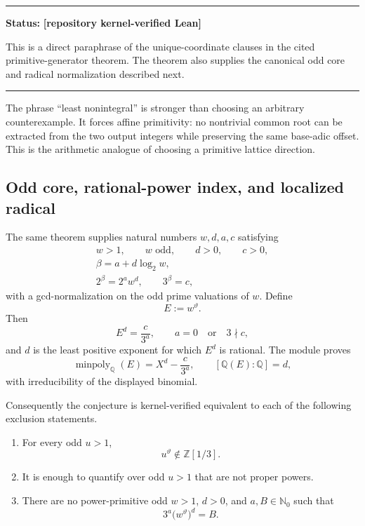 \documentclass[11pt,oneside]{article}
\theoremstyle{definition}
\theoremstyle{remark}
\newcommand{\Nzero}{\mathbb N_0}
\newcommand{\Z}{\mathbb Z}
\newcommand{\Q}{\mathbb Q}
\newcommand{\thetaq}{\vartheta}
\newcommand{\statuslean}{\textcolor{leanblue}{\textbf{[repository kernel-verified Lean]}}}
\newenvironment{statusbox}[1]
{\begin{center}\begin{minipage}{0.94\textwidth}\raggedright\hbadness=10000\hrule\vspace{0.45em}\textbf{Status:} #1\par\vspace{0.35em}}
{\vspace{0.35em}\hrule\end{minipage}\end{center}}
\begin{document}
\begin{statusbox}{\statuslean}
This is a direct paraphrase of the unique-coordinate clauses in the cited primitive-generator
theorem.  The theorem also supplies the canonical odd core and radical normalization described
next.
\end{statusbox}

The phrase ``least nonintegral'' is stronger than choosing an arbitrary counterexample.  It
forces affine primitivity: no nontrivial common root can be extracted from the two output
integers while preserving the same base-adic offset.  This is the arithmetic analogue of
choosing a primitive lattice direction.

\subsection{Odd core, rational-power index, and localized radical}

The same theorem supplies natural numbers $w,d,a,c$ satisfying
\[
 \begin{gathered}
   w>1,\qquad w\text{ odd},\qquad d>0,\qquad c>0,\\
   \beta=a+d\log_2w,\\
   2^\beta=2^aw^d,\qquad 3^\beta=c,
 \end{gathered}
\]
with a gcd-normalization on the odd prime valuations of $w$.  Define
\[
  E:=w^{\thetaq}.
\]
Then
\begin{equation}
  E^d=\frac{c}{3^a},
  \qquad a=0\quad\text{or}\quad 3\nmid c,
  \label{eq:radical-normalization}
\end{equation}
and $d$ is the least positive exponent for which $E^d$ is rational.  The module
 proves
\begin{equation}
 \operatorname{minpoly}_{\Q}(E)=X^d-\frac{c}{3^a},
 \qquad [\Q(E):\Q]=d,
 \label{eq:minpoly}
\end{equation}
with irreducibility of the displayed binomial.

Consequently the conjecture is kernel-verified equivalent to each of the following exclusion
statements.

\begin{enumerate}
\item For every odd $u>1$,
\begin{equation}
  u^{\thetaq}\notin\Z[1/3].
  \label{eq:localized-radical}
\end{equation}

\item It is enough to quantify over odd $u>1$ that are not proper powers.

\item There are no power-primitive odd $w>1$, $d>0$, and $a,B\in\Nzero$ such that
\begin{equation}
  3^a\bigl(w^{\thetaq}\bigr)^d=B.
  \label{eq:primitive-radical}
\end{equation}
\end{enumerate}
\end{document}
